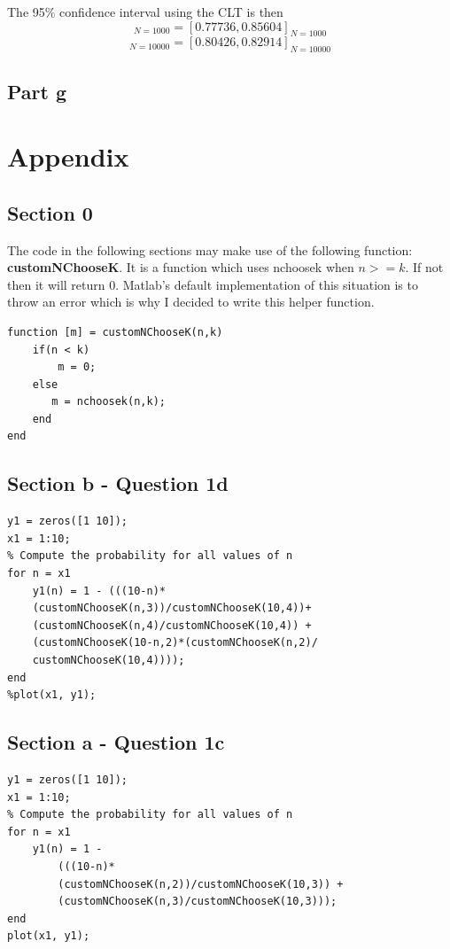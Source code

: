 \documentclass[14.5pt]{article}
\begin{document}
The 95\% confidence interval using the CLT is then
\begin{equation}
    [\mu − 2\sigma, \mu +2\sigma]_{N=1000} = [0.77736‬, 0.85604]_{N=1000}
\end{equation}
\begin{equation}
    [\mu − 2\sigma, \mu +2\sigma]_{N=10000} = [0.80426, 0.82914]_{N=10000}
\end{equation}
\subsection*{Part g}

\section*{Appendix}
\subsection*{Section 0}
The code in the following sections may make use of the following function:
\textbf{customNChooseK}. It is a function which uses nchoosek when $ n >= k $.
If not then it will return 0. Matlab's default implementation of this situation is
to throw an error which is why I decided to write this helper function.
\begin{lstlisting}
function [m] = customNChooseK(n,k)
    if(n < k)
        m = 0;
    else
       m = nchoosek(n,k); 
    end
end
\end{lstlisting}

\subsection*{Section b - Question 1d}
\begin{lstlisting}
y1 = zeros([1 10]);
x1 = 1:10;
% Compute the probability for all values of n
for n = x1
    y1(n) = 1 - (((10-n)*
    (customNChooseK(n,3))/customNChooseK(10,4))+
    (customNChooseK(n,4)/customNChooseK(10,4)) + 
    (customNChooseK(10-n,2)*(customNChooseK(n,2)/
    customNChooseK(10,4))));
end
%plot(x1, y1);
\end{lstlisting}

\subsection*{Section a - Question 1c}
\begin{lstlisting}
y1 = zeros([1 10]);
x1 = 1:10;
% Compute the probability for all values of n
for n = x1
    y1(n) = 1 - 
        (((10-n)*
        (customNChooseK(n,2))/customNChooseK(10,3)) +
        (customNChooseK(n,3)/customNChooseK(10,3)));
end
plot(x1, y1);
\end{lstlisting}
\end{document}
